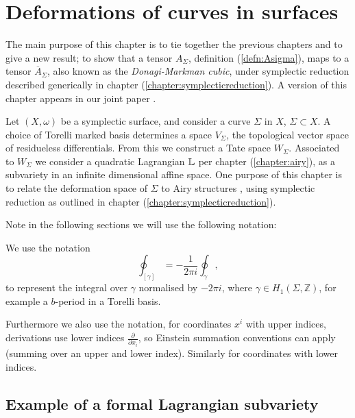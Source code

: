 \chapter{Deformations of curves in surfaces}
    \label{chapter:Atensor}
    
    
    
    
    The main purpose of this chapter is to tie together the previous chapters and to give a new result; to show that a tensor \(A_\Sigma\), definition (\ref{defn:Asigma}), maps to a tensor \(\overline{A}_\Sigma\), also known as the \emph{Donagi-Markman cubic}, under symplectic reduction described generically in chapter (\ref{chapter:symplecticreduction}). A version of this chapter appears in our joint paper \cite{chaimanowong2020airy}.  
    
    Let \( (X,\omega)\) be a symplectic surface, and consider a curve \(\Sigma\) in \(X\), \( \Sigma \subset X\). A choice of Torelli marked basis determines a space \( V_{\Sigma}\), the topological vector space of residueless differentials. From this we construct a Tate space \( W_\Sigma\). Associated to \(W_\Sigma\) we consider a quadratic Lagrangian \( \mathbb{L}\) per chapter (\ref{chapter:airy}), as a subvariety in an infinite dimensional affine space. One purpose of this chapter is to relate the deformation space of \( \Sigma\) to Airy structures \cite{ks_airy}, using symplectic reduction as outlined in chapter (\ref{chapter:symplecticreduction}).
    
    Note in the following sections we will use the following notation:
    
    \begin{defn}
    \label{defn:normalint}
    We use the notation \[ \oint_{[\gamma]} = -\frac{1}{2 \pi i} \oint_{\gamma},\] to represent the integral over \(\gamma\) normalised by \( - 2 \pi i \),
    where \(\gamma \in H_1(\Sigma,\mathbb{Z})\), for example a \(b\)-period in a Torelli basis.
    \end{defn}
    
    Furthermore we also use the notation, for coordinates \(x^i\) with upper indices, derivations use lower indices \( \frac{\partial}{\partial x_i}\), so Einstein summation conventions can apply (summing over an upper and lower index). Similarly for coordinates with lower indices.
    
    \section{Example of a formal Lagrangian subvariety}
    

